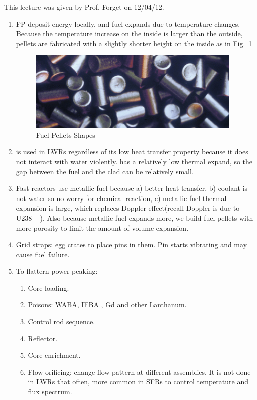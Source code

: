 \documentclass{school-22.211-notes}
\begin{document}
\clearpage
{}
This lecture was given by Prof. Forget on 12/04/12. 
\begin{enumerate}
\item FP deposit energy locally, and fuel expands due to temperature changes. Because the temperature increase on the inside is larger than the outside, pellets are fabricated with a slightly shorter height on the inside as in Fig.~\ref{fuel_pellets}
\begin{figure}[ht]
  \centering
  \includegraphics[width=4in]{images/dfs/fuel_pellets.png}
  \caption{Fuel Pellets Shapes} \label{fuel_pellets}
\end{figure}


\item {} is used in LWRs regardless of its low heat transfer property because it does not interact with water violently.  has a relatively low thermal expand, so the gap between the fuel and the clad can be relatively small. 

\item Fast reactors use metallic fuel because a) better heat transfer, b) coolant is not water so no worry for chemical reaction, c) metallic fuel thermal expansion is large, which replaces Doppler effect(recall Doppler is due to U238 -- ). Also because metallic fuel expands more, we build fuel pellets with more porosity to limit the amount of volume expansion. 

\item Grid straps: egg crates to place pins in them. Pin starts vibrating and may cause fuel failure. 

\item To flattern power peaking: 
  \begin{enumerate}
  \item Core loading. 
  \item Poisons: WABA, IFBA , Gd and other Lanthanum. 
  \item Control rod sequence. 
  \item Reflector. 
  \item Core enrichment. 
  \item Flow orificing: change flow pattern at different assemblies. It is not done in LWRs that often, more common in SFRs to control temperature and flux spectrum. 
  \end{enumerate}


\end{enumerate}
\end{document}
